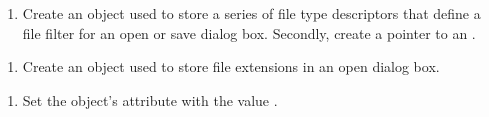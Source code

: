 \documentclass[letterpaper,12pt,english,openany,oneside]{sphinxmanual}
\begin{document}
\begin{sphinxVerbatim}[commandchars=\\\{\}]
 
\end{sphinxVerbatim}
\begin{enumerate}
%
\setcounter{enumi}{1}
\item {} 
Create an  object used to store a series of file type descriptors that define a file filter for an open or save dialog box. Secondly, create a pointer to an .

\end{enumerate}

\begin{sphinxVerbatim}[commandchars=\\\{\}]
 
\end{sphinxVerbatim}
\begin{enumerate}
%
\setcounter{enumi}{2}
\item {} 
Create an  object used to store file extensions in an open dialog box.

\end{enumerate}

\begin{sphinxVerbatim}[commandchars=\\\{\}]
 
\end{sphinxVerbatim}
\begin{enumerate}
%
\setcounter{enumi}{3}
\item {} 
Set the  object’s  attribute with the value .

\end{enumerate}
\end{document}
